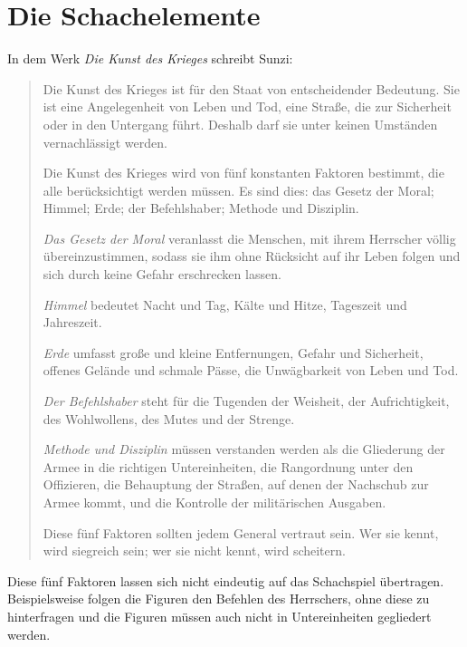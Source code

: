\documentclass[
  a4paper,
  justified,
  nobib,
]{tufte-handout}
\begin{document}
\section{Die Schachelemente}%
\label{sec:die_schachelemente}

In dem Werk \emph{Die Kunst des Krieges} schreibt Sunzi:
\begin{quotation}
  Die Kunst des Krieges ist für den Staat von entscheidender Bedeutung. Sie ist eine
  Angelegenheit von Leben und Tod, eine Straße, die zur Sicherheit oder in den Untergang
  führt. Deshalb darf sie unter keinen Umständen vernachlässigt werden.

  Die Kunst des Krieges wird von fünf konstanten Faktoren bestimmt, die alle
  berücksichtigt werden müssen. Es sind dies: das Gesetz der Moral; Himmel; Erde; der
  Befehlshaber; Methode und Disziplin.

  \emph{Das Gesetz der Moral} veranlasst die Menschen, mit ihrem Herrscher völlig
  übereinzustimmen, sodass sie ihm ohne Rücksicht auf ihr Leben folgen und sich durch
  keine Gefahr erschrecken lassen.

  \emph{Himmel} bedeutet Nacht und Tag, Kälte und Hitze, Tageszeit und Jahreszeit.

  \emph{Erde} umfasst große und kleine Entfernungen, Gefahr und Sicherheit, offenes
  Gelände und schmale Pässe, die Unwägbarkeit von Leben und Tod.

  \emph{Der Befehlshaber} steht für die Tugenden der Weisheit, der Aufrichtigkeit, des
  Wohlwollens, des Mutes und der Strenge.

  \emph{Methode und Disziplin} müssen verstanden werden als die Gliederung der Armee in
  die richtigen Untereinheiten, die Rangordnung unter den Offizieren, die Behauptung der
  Straßen, auf denen der Nachschub zur Armee kommt, und die Kontrolle der militärischen
  Ausgaben.

  Diese fünf Faktoren sollten jedem General vertraut sein. Wer sie kennt, wird siegreich
  sein; wer sie nicht kennt, wird scheitern.
\end{quotation}

Diese fünf Faktoren lassen sich nicht eindeutig auf das Schachspiel übertragen.
Beispielsweise folgen die Figuren den Befehlen des Herrschers, ohne diese zu hinterfragen
und die Figuren müssen auch nicht in Untereinheiten gegliedert werden.
\end{document}
